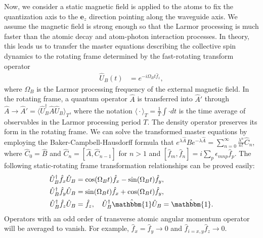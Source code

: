 \documentclass[preprint,aps,pra,onecolumn,superscriptaddress]{revtex4-1} %
\newcommand{\expect}[1]{\big\langle #1 \big\rangle}
\begin{document}
\begin{appendix}
    
Now, we consider a static magnetic field is applied to the atoms to fix the quantization axis to the $ \mathbf{e}_{z} $ direction pointing along the waveguide axis.
We assume the magnetic field is strong enough so that the Larmor processing is much faster than the atomic decay and atom-photon interaction processes.
In theory, this leads us to transfer the master equations describing the collective spin dynamics to the rotating frame determined by the fast-rotating transform operator
\begin{align}
\hat{U}_B(t) &= e^{-i\Omega_Bt\hat{f}_z},
\end{align}
where $ \Omega_B $ is the Larmor processing frequency of the external magnetic field.
In the rotating frame, a quantum operator $ \hat{A} $ is transferred into $ \hat{A}' $ through $ \hat{A}\rightarrow \hat{A}'=\expect{\hat{U}_B^\dagger\hat{A}\hat{U}_B }_T $, where the notation $ \expect{\cdot}_T=\frac{1}{T}\int\cdot dt $ is the time average of observables in the Larmor processing period $ T $.
The density operator preserves its form in the rotating frame.
We can solve the transformed master equations by employing the Baker-Campbell-Hausdorff formula that $ e^{\lambda\hat{A}}\hat{B}e^{-\lambda\hat{A}}=\sum_{n=0}^\infty\frac{\lambda^n}{n!}\hat{C}_n $, where $ \hat{C}_0=\hat{B} $ and $ \hat{C}_n=\left[\hat{A},\hat{C}_{n-1} \right] $ for $ n>1 $ and $ \left[\hat{f}_m, \hat{f}_n\right]=i\sum_p\epsilon_{mnp}\hat{f}_p $.
The following static-rotating frame transformation relationships can be proved easily:
\begin{subequations}\label{eq:rotationtransf}
	\begin{align}
	\hat{U}_B^\dagger\hat{f}_{x}\hat{U}_B&=\cos(\Omega_Bt)\hat{f}_x-\sin(\Omega_Bt)\hat{f}_y,\\
	\hat{U}_B^\dagger\hat{f}_{y}\hat{U}_B &= \sin(\Omega_Bt)\hat{f}_x+ \cos(\Omega_Bt)\hat{f}_y, \\ \hat{U}_B^\dagger\hat{f}_{z}\hat{U}_B &=\hat{f}_z,\quad \hat{U}_B^\dagger\hat{\mathbbm{1}}\hat{U}_B =\hat{\mathbbm{1}}.
	\end{align}
\end{subequations}
Operators with an odd order of transverse atomic angular momentum operator will be averaged to vanish. For example, $ \hat{f}_{x}=\hat{f}_{y} \rightarrow 0 $ and $ \hat{f}_{i=x,y}\hat{f}_{z}\rightarrow 0 $.



\end{appendix}
\end{document}

